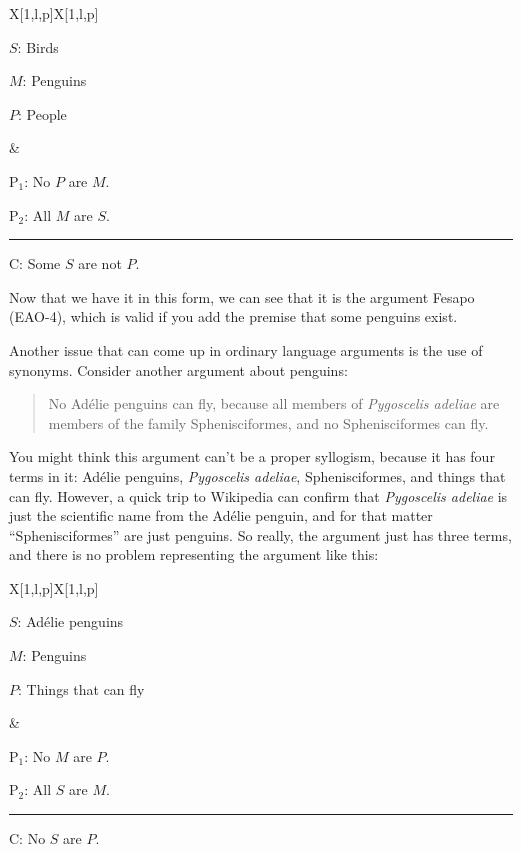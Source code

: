 \begin{tabu}{{X[1,l,p]X[1,l,p]}}


\begin{ekey}
\item[$S$:] Birds
\item[$M$:] Penguins
\item[$P$:] People
\end{ekey}

&

\begin{earg}
\item[P$_1$:] No $P$ are $M$. 
\item[P$_2$:] All $M$ are $S$.
\vspace{-.5em}
\item [] \rule{0.4\linewidth}{.5pt} 
\item[C:] Some $S$ are not $P$.
\end{earg} 

\end{tabu}

Now that we have it in this form, we can see that it is the argument Fesapo (EAO-4), which is valid if you add the premise that some penguins exist.

Another issue that can come up in ordinary language arguments is the use of synonyms. Consider another argument about penguins:

\begin{quotation}
\noindent No Ad\'{e}lie penguins can fly, because all members of \emph{Pygoscelis adeliae} are members of the family Sphenisciformes, and no Sphenisciformes can fly.
\end{quotation}

You might think this argument can't be a proper syllogism, because it has four terms in it: Ad\'{e}lie penguins, \emph{Pygoscelis adeliae}, Sphenisciformes, and things that can fly. However, a quick trip to Wikipedia can confirm that \emph{Pygoscelis adeliae} is just the scientific name from the Ad\'{e}lie penguin, and for that matter ``Sphenisciformes'' are just penguins. So really, the argument just has three terms, and there is no problem representing the argument  like this:

\begin{tabu}{{X[1,l,p]X[1,l,p]}}


\begin{ekey}
\item[$S$:] Ad\'{e}lie penguins
\item[$M$:] Penguins
\item[$P$:] Things that can fly 
\end{ekey}

&

\begin{earg}
\item[P$_1$:]  No $M$ are $P$.
\item[P$_2$:] All $S$ are $M$.
\vspace{-.5em}
\item [] \rule{0.4\linewidth}{.5pt} 
\item[C:] No $S$ are $P$.
\end{earg} 

\end{tabu}

